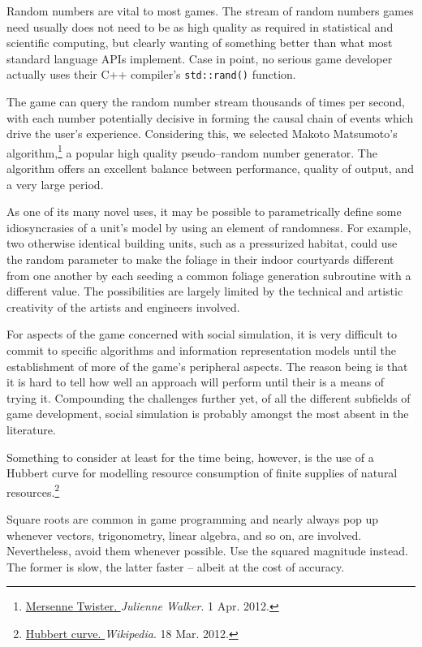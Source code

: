 Random numbers are vital to most games. The stream of random numbers games need usually does not need to be as high quality as required in statistical and scientific computing, but clearly wanting of something better than what most standard language APIs implement. Case in point, no serious game developer actually uses their C++ compiler's {\tt std::rand()} function.

The game can query the random number stream thousands of times per second, with each number potentially decisive in forming the causal chain of events which drive the user's experience. Considering this, we selected Makoto Matsumoto's algorithm,\footnote{\href{http://www.eternallyconfuzzled.com/tuts/algorithms/jsw_tut_rand.aspx\#mersenne}{Mersenne Twister. }{\it Julienne Walker}. 1 Apr. 2012.} a popular high quality pseudo--random number generator. The algorithm offers an excellent balance between performance, quality of output, and a very large period.

As one of its many novel uses, it may be possible to parametrically define some idiosyncrasies of a unit's model by using an element of randomness. For example, two otherwise identical building units, such as a pressurized habitat, could use the random parameter to make the foliage in their indoor courtyards different from one another by each seeding a common foliage generation subroutine with a different value. The possibilities are largely limited by the technical and artistic creativity of the artists and engineers involved.

For aspects of the game concerned with social simulation, it is very difficult to commit to specific algorithms and information representation models until the establishment of more of the game's peripheral aspects. The reason being is that it is hard to tell how well an approach will perform until their is a means of trying it. Compounding the challenges further yet, of all the different subfields of game development, social simulation is probably amongst the most absent in the literature.

Something to consider at least for the time being, however, is the use of a Hubbert curve for modelling resource consumption of finite supplies of natural resources.\footnote{\href{https://en.wikipedia.org/wiki/Hubbert_curve}{Hubbert curve. }{\it Wikipedia}. 18 Mar. 2012.}

Square roots are common in game programming and nearly always pop up whenever vectors, trigonometry, linear algebra, and so on, are involved. Nevertheless, avoid them whenever possible. Use the squared magnitude instead. The former is slow, the latter faster -- albeit at the cost of accuracy.

